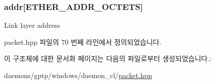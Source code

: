 \subsubsection[{\texorpdfstring{addr}{addr}}]{ addr\mbox{[}{\bf E\+T\+H\+E\+R\+\_\+\+A\+D\+D\+R\+\_\+\+O\+C\+T\+E\+TS}\mbox{]}}\hypertarget{structpacket__addr__t_ab8af51bba340e97aebc45b9c943fb17c}{}\label{structpacket__addr__t_ab8af51bba340e97aebc45b9c943fb17c}
Link layer address 

packet.\+hpp 파일의 70 번째 라인에서 정의되었습니다.



이 구조체에 대한 문서화 페이지는 다음의 파일로부터 생성되었습니다.\+:\begin{DoxyCompactItemize}
\item 
daemons/gptp/windows/daemon\+\_\+cl/\hyperlink{packet_8hpp}{packet.\+hpp}\end{DoxyCompactItemize}
